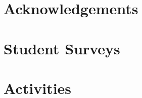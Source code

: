 \documentclass{report}
\begin{document}
    \chapter*{Acknowledgements}
        

    \printbibliography[heading=bibintoc, title={References}]

    \appendix
    \chapter{Student Surveys}\label{app:surveys}
    

    \chapter{Activities}\label{app:CTFs}
    
\end{document}
